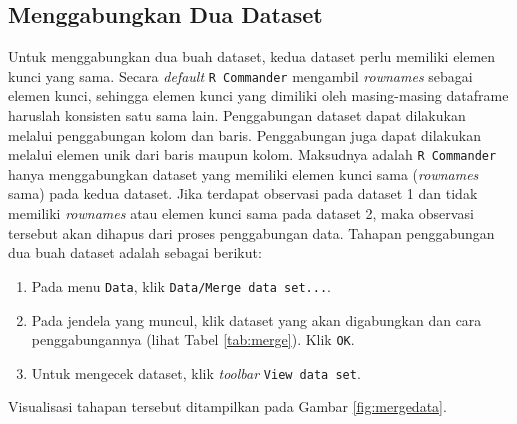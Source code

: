 \documentclass[12pt,]{krantz}
\providecommand{\tightlist}{%
  \setlength{\itemsep}{0pt}\setlength{\parskip}{0pt}}
\begin{document}
\hypertarget{menggabungkan-dua-dataset}{%
\subsection{Menggabungkan Dua Dataset}\label{menggabungkan-dua-dataset}}

Untuk menggabungkan dua buah dataset, kedua dataset perlu memiliki elemen kunci yang sama. Secara \emph{default} \texttt{R\ Commander} mengambil \emph{rownames} sebagai elemen kunci, sehingga elemen kunci yang dimiliki oleh masing-masing dataframe haruslah konsisten satu sama lain. Penggabungan dataset dapat dilakukan melalui penggabungan kolom dan baris. Penggabungan juga dapat dilakukan melalui elemen unik dari baris maupun kolom. Maksudnya adalah \texttt{R\ Commander} hanya menggabungkan dataset yang memiliki elemen kunci sama (\emph{rownames} sama) pada kedua dataset. Jika terdapat observasi pada dataset 1 dan tidak memiliki \emph{rownames} atau elemen kunci sama pada dataset 2, maka observasi tersebut akan dihapus dari proses penggabungan data. Tahapan penggabungan dua buah dataset adalah sebagai berikut:

\begin{enumerate}
\def\labelenumi{\arabic{enumi}.}
\tightlist
\item
  Pada menu \texttt{Data}, klik \texttt{Data/Merge\ data\ set...}.
\item
  Pada jendela yang muncul, klik dataset yang akan digabungkan dan cara penggabungannya (lihat Tabel \ref{tab:merge}). Klik \texttt{OK}.
\item
  Untuk mengecek dataset, klik \emph{toolbar} \texttt{View\ data\ set}.
\end{enumerate}

Visualisasi tahapan tersebut ditampilkan pada Gambar \ref{fig:mergedata}.
\end{document}
